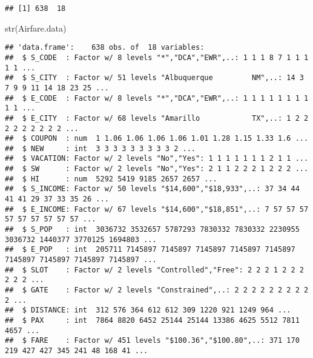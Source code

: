 \documentclass[]{article}
\newenvironment{Shaded}{\begin{snugshade}}{\end{snugshade}}
\newcommand{\FunctionTok}[1]{\textcolor[rgb]{0.00,0.00,0.00}{#1}}
\newcommand{\NormalTok}[1]{#1}
\begin{document}
\begin{verbatim}
## [1] 638  18
\end{verbatim}

\begin{Shaded}
\begin{Highlighting}[]
\FunctionTok{str}\NormalTok{(Airfare.data)}
\end{Highlighting}
\end{Shaded}

\begin{verbatim}
## 'data.frame':    638 obs. of  18 variables:
##  $ S_CODE  : Factor w/ 8 levels "*","DCA","EWR",..: 1 1 1 8 7 1 1 1 1 1 ...
##  $ S_CITY  : Factor w/ 51 levels "Albuquerque         NM",..: 14 3 7 9 9 11 14 18 23 25 ...
##  $ E_CODE  : Factor w/ 8 levels "*","DCA","EWR",..: 1 1 1 1 1 1 1 1 1 1 ...
##  $ E_CITY  : Factor w/ 68 levels "Amarillo            TX",..: 1 2 2 2 2 2 2 2 2 2 ...
##  $ COUPON  : num  1 1.06 1.06 1.06 1.06 1.01 1.28 1.15 1.33 1.6 ...
##  $ NEW     : int  3 3 3 3 3 3 3 3 3 2 ...
##  $ VACATION: Factor w/ 2 levels "No","Yes": 1 1 1 1 1 1 1 2 1 1 ...
##  $ SW      : Factor w/ 2 levels "No","Yes": 2 1 1 2 2 2 1 2 2 2 ...
##  $ HI      : num  5292 5419 9185 2657 2657 ...
##  $ S_INCOME: Factor w/ 50 levels "$14,600","$18,933",..: 37 34 44 41 41 29 37 33 35 26 ...
##  $ E_INCOME: Factor w/ 67 levels "$14,600","$18,851",..: 7 57 57 57 57 57 57 57 57 57 ...
##  $ S_POP   : int  3036732 3532657 5787293 7830332 7830332 2230955 3036732 1440377 3770125 1694803 ...
##  $ E_POP   : int  205711 7145897 7145897 7145897 7145897 7145897 7145897 7145897 7145897 7145897 ...
##  $ SLOT    : Factor w/ 2 levels "Controlled","Free": 2 2 2 1 2 2 2 2 2 2 ...
##  $ GATE    : Factor w/ 2 levels "Constrained",..: 2 2 2 2 2 2 2 2 2 2 ...
##  $ DISTANCE: int  312 576 364 612 612 309 1220 921 1249 964 ...
##  $ PAX     : int  7864 8820 6452 25144 25144 13386 4625 5512 7811 4657 ...
##  $ FARE    : Factor w/ 451 levels "$100.36","$100.80",..: 371 170 219 427 427 345 241 48 168 41 ...
\end{verbatim}
\end{document}
